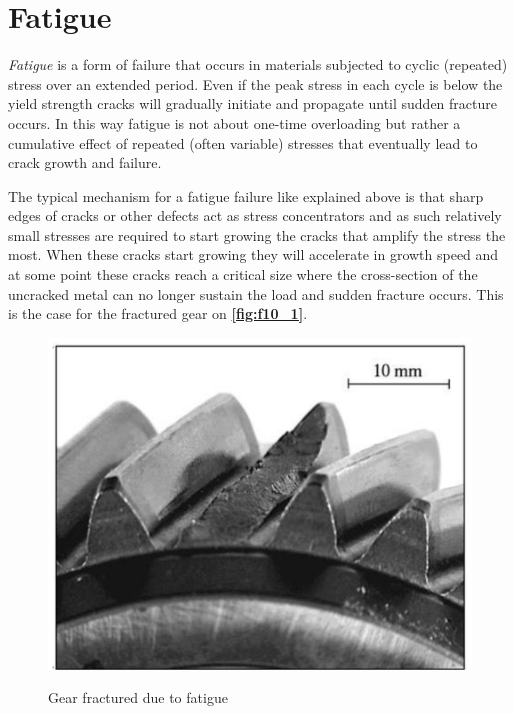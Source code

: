 
\section{Fatigue}

\begin{definition}[Fatigue]
  \textit{Fatigue} is a form of failure that occurs in materials subjected to cyclic (repeated) stress over an extended period. Even if the peak stress in each cycle is below the yield strength cracks will gradually initiate and propagate until sudden fracture occurs. In this way fatigue is not about one-time overloading but rather a cumulative effect of repeated (often variable) stresses that eventually lead to crack growth and failure.
\end{definition}

The typical mechanism for a fatigue failure like explained above is that sharp edges of cracks or other defects act as stress concentrators and as such relatively small stresses are required to start growing the cracks that amplify the stress the most. When these cracks start growing they will accelerate in growth speed and at some point these cracks reach a critical size where the cross-section of the uncracked metal can no longer sustain the load and sudden fracture occurs. This is the case for the fractured gear on \textbf{\autoref{fig:f10_1}}.
\begin{figure} [ht]
  \centering
  \caption{Gear fractured due to fatigue}
  \includegraphics[width=0.5\linewidth]{./figures/f10_1.png}
  \label{fig:f10_1}
\end{figure}


